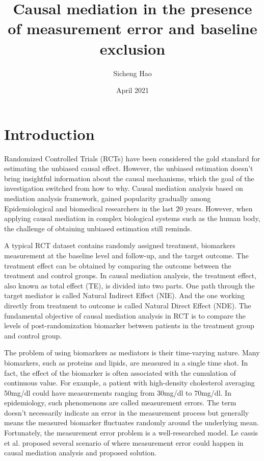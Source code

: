 \documentclass{article}
\title{Causal mediation in the presence of measurement error and baseline exclusion}
\author{Sicheng Hao}
\date{April 2021}
\begin{document}
\maketitle

\section{Introduction}


Randomized Controlled Trials (RCTs) have been considered the gold standard for estimating the unbiased causal effect. However, the unbiased estimation doesn’t  bring insightful information about the causal mechanisms, which the goal of the investigation switched from how to why. Causal mediation analysis based on mediation analysis framework, gained popularity gradually among Epidemiological and biomedical researchers in the last 20 years. However, when applying causal mediation in complex biological systems such as the human body, the challenge of obtaining unbiased estimation still reminds. 

A typical RCT dataset contains randomly assigned treatment, biomarkers measurement at the baseline level and follow-up, and the target outcome.  The treatment effect can be obtained by comparing the outcome between the treatment and control groups. In causal mediation analysis, the treatment effect, also known as total effect (TE), is divided into two parts. One path through the target mediator is called Natural Indirect Effect (NIE). And the one working directly from treatment to outcome is called Natural Direct Effect (NDE). The fundamental objective of causal mediation analysis in RCT is to compare the levels of post-randomization biomarker between patients in the treatment group and control group. 

The problem of using biomarkers as mediators is their time-varying nature. Many biomarkers, such as proteins and lipids, are measured in a single time shot. In fact, the effect of the biomarker is often associated with the cumulation of continuous value. For example, a patient with high-density cholesterol averaging 50mg/dl could have measurements ranging from 30mg/dl to 70mg/dl. In epidemiology, such phenomenons are called measurement errors. The term doesn’t necessarily indicate an error in the measurement process but generally means the measured biomarker fluctuates randomly around the underlying mean. Fortunately, the measurement error problem is a well-researched model. Le cassis et al. proposed several scenario of where measurement error could happen in causal mediation analysis and proposed solution. 
\end{document}
